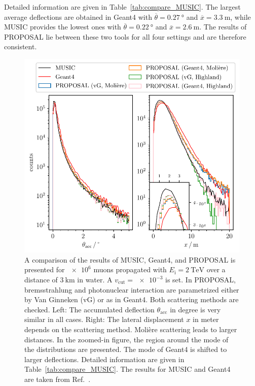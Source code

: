 Detailed information are given in Table~\ref{tab:compare_MUSIC}. 
The largest average deflections are obtained in Geant4 with 
$\overline{\theta} = \SI{0.27}{\degree}$ 
and $\overline{x} = \SI{3.3}{\meter}$, while MUSIC provides the lowest 
ones with $\overline{\theta} = \SI{0.22}{\degree}$ and 
$\overline{x} = \SI{2.6}{\meter}$.
The results of PROPOSAL lie between 
these two tools for all four settings and are therefore consistent. 

\begin{figure}
    \centering 
    \includegraphics{../../deflection/plots/FINAL/2TeV_1e6events_accumulated_defl_paper_combined_zoom.pdf}
    \caption{A comparison of the results of MUSIC, Geant4, and PROPOSAL is presented for $\num{e6}$ muons propagated with 
    $E_{\text{i}} = \SI{2}{\tera\electronvolt}$ over a distance of 
    $\SI{3}{\kilo\meter}$ in water. A $v_{\mathrm{cut}} = \num{e-3}$ is set. In PROPOSAL, 
    bremsstrahlung and photonuclear interaction are parametrized either by 
    Van Ginneken (vG) or as in Geant4. Both scattering methods are checked. 
    Left: The accumulated deflection $\theta_{\mathrm{acc}}$ in degree is very similar in all cases.
    Right: The lateral displacement $x$ in meter depends 
    on the scattering method. Molière scattering leads to larger distances.
    In the zoomed-in figure, the region around the mode of the distributions are presented. 
    The mode of Geant4 is shifted to larger deflections.
    Detailed information are given in 
    Table~\ref{tab:compare_MUSIC}. The results for MUSIC and Geant4 are taken from 
    Ref.~\cite{comparison_MUSIC_GEANT4_2009}.}
    \label{fig:compare_MUSIC}
\end{figure}
